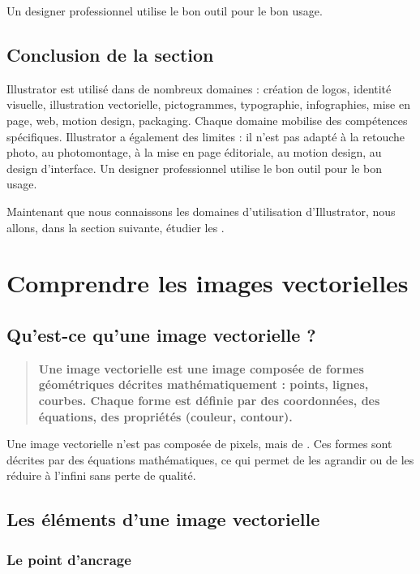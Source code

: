 Un designer professionnel utilise le bon outil pour le bon usage.

\subsection*{Conclusion de la section}

Illustrator est utilisé dans de nombreux domaines : création de logos, identité visuelle, illustration vectorielle, pictogrammes, typographie, infographies, mise en page, web, motion design, packaging. Chaque domaine mobilise des compétences spécifiques. Illustrator a également des limites : il n'est pas adapté à la retouche photo, au photomontage, à la mise en page éditoriale, au motion design, au design d'interface. Un designer professionnel utilise le bon outil pour le bon usage.

Maintenant que nous connaissons les domaines d'utilisation d'Illustrator, nous allons, dans la section suivante, étudier les .

\section{Comprendre les images vectorielles}

\subsection{Qu'est-ce qu'une image vectorielle ?}

\begin{quote}
\textbf{Une image vectorielle est une image composée de formes géométriques décrites mathématiquement : points, lignes, courbes. Chaque forme est définie par des coordonnées, des équations, des propriétés (couleur, contour).}
\end{quote}

Une image vectorielle n'est pas composée de pixels, mais de . Ces formes sont décrites par des équations mathématiques, ce qui permet de les agrandir ou de les réduire à l'infini sans perte de qualité.

\subsection{Les éléments d'une image vectorielle}

\subsubsection{Le point d'ancrage}


